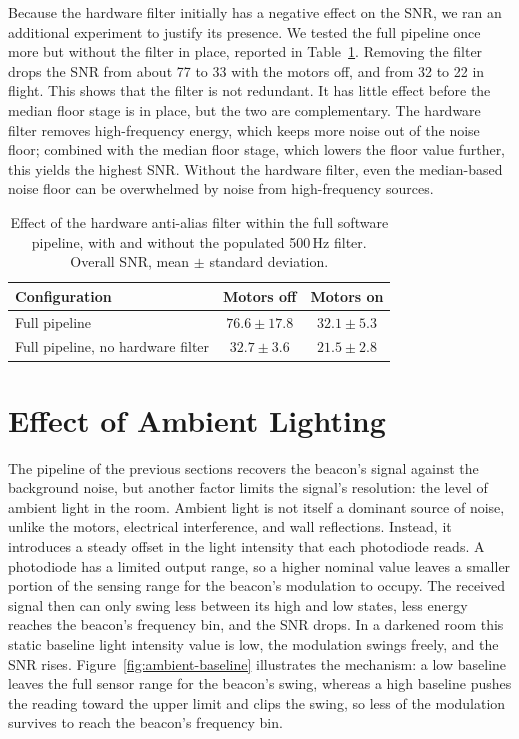 Because the hardware filter initially has a negative effect on the SNR, we ran an additional experiment to justify its presence. We tested the full pipeline once more but without the filter in place, reported in Table~\ref{tab:filter-hw}. Removing the filter drops the SNR from about 77 to 33 with the motors off, and from 32 to 22 in flight. This shows that the filter is not redundant. It has little effect before the median floor stage is in place, but the two are complementary. The hardware filter removes high-frequency energy, which keeps more noise out of the noise floor; combined with the median floor stage, which lowers the floor value further, this yields the highest SNR. Without the hardware filter, even the median-based noise floor can be overwhelmed by noise from high-frequency sources.

\begin{table}[htbp]
    \centering
    \caption{Effect of the hardware anti-alias filter within the full software pipeline, with and without the populated 500\,Hz filter. Overall SNR, mean $\pm$ standard deviation.}
    \label{tab:filter-hw}
    \begin{tabular}{l c c}
        \hline
        Configuration & Motors off & Motors on \\
        \hline
        Full pipeline                     & $76.6 \pm 17.8$ & $32.1 \pm 5.3$ \\
        Full pipeline, no hardware filter & $32.7 \pm 3.6$  & $21.5 \pm 2.8$ \\
        \hline
    \end{tabular}
\end{table}

\section{Effect of Ambient Lighting}
\label{sec:ambient}

The pipeline of the previous sections recovers the beacon's signal against the background noise, but another factor limits the signal's resolution: the level of ambient light in the room. Ambient light is not itself a dominant source of noise, unlike the motors, electrical interference, and wall reflections. Instead, it introduces a steady offset in the light intensity that each photodiode reads. A photodiode has a limited output range, so a higher nominal value leaves a smaller portion of the sensing range for the beacon's modulation to occupy. The received signal then can only swing less between its high and low states, less energy reaches the beacon's frequency bin, and the SNR drops. In a darkened room this static baseline light intensity value is low, the modulation swings freely, and the SNR rises. Figure~\ref{fig:ambient-baseline} illustrates the mechanism: a low baseline leaves the full sensor range for the beacon's swing, whereas a high baseline pushes the reading toward the upper limit and clips the swing, so less of the modulation survives to reach the beacon's frequency bin.

